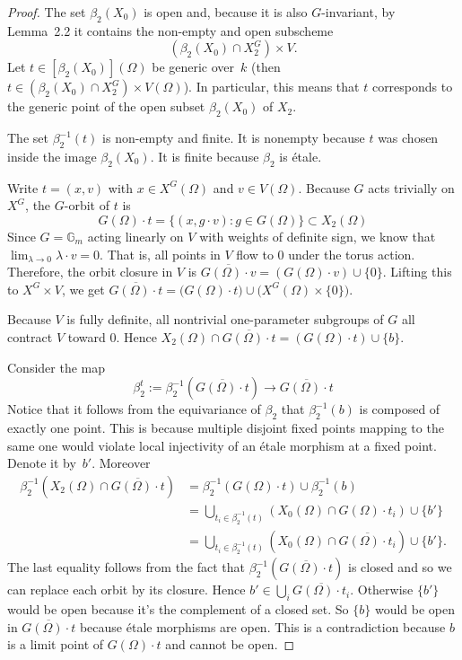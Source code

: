 \documentclass[12pt]{article}
\begin{document}
\begin{proof}
The set $\beta_2(X_0)$ is open and, because it is also $G$-invariant,
by Lemma~2.2 it contains the non-empty and open subscheme
\[
  (\beta_2(X_0)\cap X_2^G)\times V .
\]
Let $t\in [\beta_2(X_0)](\Omega)$ be generic over~$k$
(then $t\in (\beta_2(X_0)\cap X_2^G)\times V(\Omega)$). In particular, this means that $t$ corresponds to the generic point of the open subset $\beta_2(X_0)$ of $X_2$.

The set $\beta_2^{-1}(t)$ is non-empty and finite. It is nonempty because $t$ was chosen inside the image $\beta_2(X_0)$. It is finite because $\beta_2$ is \'etale. 


Write $t = (x,v)$ with $x \in X^G(\Omega)$ and $v \in V(\Omega)$. Because $G$ acts trivially on $X^G$, the $G$-orbit of $t$ is \[G(\Omega)\cdot t = \{(x, g\cdot v) : g\in G(\Omega)\} \subset X_2(\Omega)\] 
Since $G = \mathbb{G}_m$ acting linearly on $V$ with weights of definite sign, we know that $\lim_{\lambda\to 0} \lambda\cdot v = 0$. That is, all points in $V$ flow to $0$ under the torus action. Therefore, the orbit closure in $V$ is $\overline{G(\Omega)\cdot v} = (G(\Omega)\cdot v) \cup \{0\}$. Lifting this to $X^G \times V$, we get $\overline{G(\Omega)\cdot t} = \big( G(\Omega)\cdot t \big) \cup \big( X^G(\Omega)\times \{0\} \big)$.

Because $V$ is fully definite, all nontrivial one-parameter subgroups of $G$ all contract $V$ toward $0$. Hence $X_2(\Omega) \cap \overline{G(\Omega)\cdot t} = (G(\Omega)\cdot t) \cup \{b\}$.

Consider the map
\[
   \beta_2^t := \beta_2^{-1}(\overline{G(\Omega)\cdot t})
      \longrightarrow \overline{G(\Omega)\cdot t}
\]
Notice that it follows from the equivariance of $\beta_2$ that $\beta_2^{-1}(b)$ is composed of exactly one point. This is because multiple disjoint fixed points mapping to the same one would violate local injectivity of an étale morphism at a fixed point. Denote it by~$b'$.
Moreover
\begin{align*}
\beta_2^{-1}(X_2(\Omega)\cap \overline{G(\Omega)\cdot t})
   &= \beta_2^{-1}(G(\Omega)\cdot t)\cup \beta_2^{-1}(b) \\
   &= \bigcup_{t_i\in\beta_2^{-1}(t)}(X_0(\Omega)\cap {G(\Omega)\cdot t_i}) \cup\{b'\} \\
   &= \bigcup_{t_i\in\beta_2^{-1}(t)}(X_0(\Omega)\cap \overline{G(\Omega)\cdot t_i})
      \cup\{b'\}.
\end{align*}
The last equality follows from the fact that $\beta_2^{-1}(\overline{G(\Omega)\cdot t})$
is closed and so we can replace each orbit by its closure. Hence $b'\in\bigcup_i\overline{G(\Omega)\cdot t_i}$.
Otherwise $\{b'\}$ would be open because it's the complement of a closed set. So $\{b\}$ would be open in
$\overline{G(\Omega)\cdot t}$ because étale morphisms are open. This is a contradiction because $b$ is a limit point of $G(\Omega)\cdot t$ and cannot be open.


\end{proof}
\end{document}
